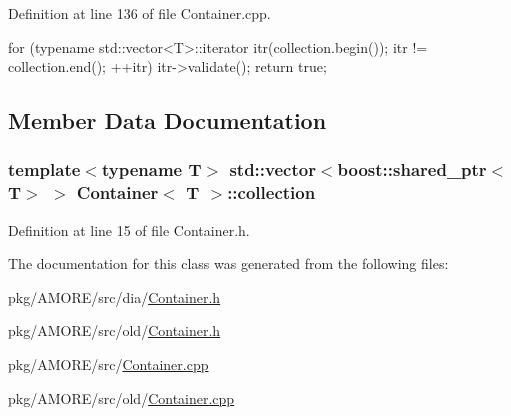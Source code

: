 Definition at line 136 of file Container.cpp.


\begin{DoxyCode}
  {
    for (typename std::vector<T>::iterator itr(collection.begin()); itr
        != collection.end(); ++itr)
      {
        itr->validate();
      }
    return true;
  }
\end{DoxyCode}


\subsection{Member Data Documentation}
\hypertarget{class_container_a6cc12233bceb7d72709320d2c57e3398}{
\subsubsection[{collection}]{\setlength{\rightskip}{0pt plus 5cm}template$<$typename T$>$ std::vector$<$boost::shared\_\-ptr$<$T$>$ $>$ {\bf Container}$<$ T $>$::{\bf collection}}}
\label{class_container_a6cc12233bceb7d72709320d2c57e3398}


Definition at line 15 of file Container.h.



The documentation for this class was generated from the following files:\begin{DoxyCompactItemize}
\item 
pkg/AMORE/src/dia/\hyperlink{dia_2_container_8h}{Container.h}\item 
pkg/AMORE/src/old/\hyperlink{old_2_container_8h}{Container.h}\item 
pkg/AMORE/src/\hyperlink{_container_8cpp}{Container.cpp}\item 
pkg/AMORE/src/old/\hyperlink{old_2_container_8cpp}{Container.cpp}\end{DoxyCompactItemize}
